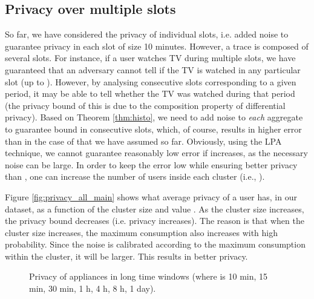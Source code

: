 \documentclass[11pt,a4paper]{article}
\theoremstyle{plain}
\theoremstyle{plain}
\theoremstyle{plain}
\theoremstyle{plain}
\theoremstyle{nonumberplain} \theoremseparator{}
\begin{document}
\subsection{Privacy over multiple slots}
So far, we have considered the privacy of individual slots, i.e. added noise to guarantee  privacy in each slot of size 10 minutes. However, a trace
is composed of several slots. For instance, if a user watches TV during multiple slots, we have guaranteed that an adversary cannot tell if the TV is watched in any particular slot (up to ). However, by analysing  consecutive slots corresponding to a given period,  it may be able to tell whether the TV was watched during that period (the privacy bound of this is  due to the composition property of differential privacy).   
Based on Theorem \ref{thm:histo}, we need to add noise  to \emph{each} aggregate to guarantee  bound in consecutive  slots, which, of course, results in higher error than in the case of  that we have assumed so far. Obviously, using the LPA technique, we cannot guarantee reasonably low error if  increases, as the necessary noise  can be large. In order to keep the error  low while ensuring better privacy than , one can increase the number of users inside each cluster (i.e., ).

Figure \ref{fig:privacy_all_main} shows what average privacy of a user has, in our dataset, as a function of 
 the cluster size and value  . 
As the cluster size increases, the privacy bound decreases (i.e. privacy increases). The reason is that when the cluster
size increases, the maximum consumption also increases with high probability. Since the noise is calibrated according to 
the maximum consumption within the cluster, it will be larger. This results in better privacy.



\begin{figure*}[ht]
\centering
{}
\caption{Privacy of appliances in  long time windows (where  is 10 min, 15 min, 30 min, 1 h, 4 h, 8 h, 1 day).}
\end{figure*}
\end{document}
